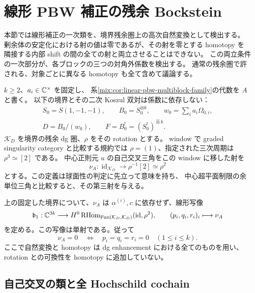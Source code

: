 \section{線形 PBW 補正の残余 Bockstein}
\label{mix:sec:linear-bockstein}

本節では線形補正の一次類を、境界残余圏上の高次自然変換として検出する。
剰余体の安定化における射の値は零であるが、その射を零とする homotopy を
隣接する内部 shift の間の全ての射と両立させることはできない。
この両立条件の一次部分が、各ブロックの三つの対角外係数を検出する。
通常の残余圏で許される、対象ごとに異なる homotopy も全て含めて議論する。

$k\ge2$、$a_i\in\mathbb C^\times$ を固定し、
系\ref{mix:cor:linear-pbw-multiblock-family}の代数を $A$ と書く。
以下の境界とその二次 Koszul 双対は係数に依存しない：
\begin{gather*}
 S_0=S(1,-1,-1),\qquad B_0=S_0^{\otimes k},\qquad
 w_0=\sum_i a_i\Omega_{0,i},\\
 D=B_0/(w_0),\qquad
 F=B_0^!=(S_0^!)^{\widehat\otimes k}.
\end{gather*}
$\mathcal K_D$ を境界の残余 dg 圏、$\rho$ をその rotation とする。
window で graded singularity category と比較する規約では
$\rho=(1)$、指定された三次周期は $\rho^3\simeq[2]$ である。
中心正則元 $u$ の自己交叉三角をこの window に移した射を
\[
 \nu_A:\operatorname{id}_{\mathcal K_D}\longrightarrow
          \rho^{-1}[2]\simeq\rho^2
\]
とする。この定義は球面性の判定に先立って意味を持ち、
中心超平面制限の余単位三角と比較すると、その第三射を与える。

\begin{theorem}[線形三方向の残余検出]
\label{mix:thm:linear-bockstein-injection}
上の固定した境界について、$\nu_A$ は
$\alpha^{(i)},c$ に依存せず、線形写像
\begin{equation}\label{mix:eq:linear-bockstein-map}
 \mathfrak b_1:\mathbb C^{3k}\longrightarrow
 H^0\operatorname{RHom}_{\operatorname{Fun}(\mathcal K_D,\mathcal K_D)}
       (\operatorname{id},\rho^2),\qquad
 (p_i,q_i,r_i)_i\longmapsto\nu_A
\end{equation}
を定める。この写像は単射である。従って
\[
              \nu_A=0\quad\Longleftrightarrow\quad
                   p_i=q_i=r_i=0\quad(1\le i\le k).
\]
ここで自然変換と homotopy は dg enhancement における全てのものを用い、
rotation との可換性を homotopy に追加していない。
\end{theorem}

\subsection{自己交叉の類と全 Hochschild cochain}

